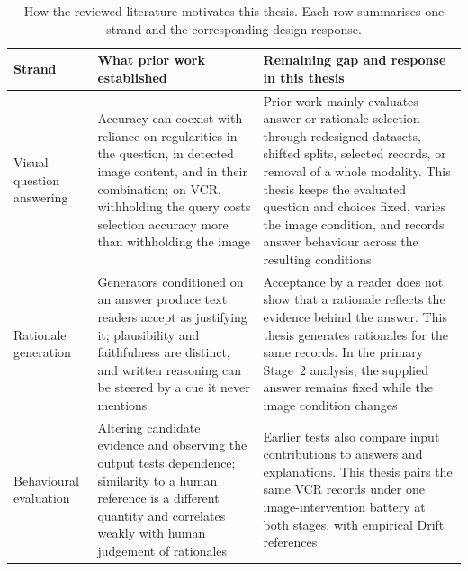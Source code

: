 \begin{table}[ht]
\centering
\caption[How the reviewed literature motivates this thesis]{How the reviewed
literature motivates this thesis. Each row summarises one strand and the
corresponding design response.}
\label{tab:background-positioning}
\begin{tabular}{L{3.0cm}L{4.8cm}L{5.7cm}}
\toprule
Strand & What prior work established & Remaining gap and response in this thesis \\
\midrule
Visual question answering &
Accuracy can coexist with reliance on regularities in the question, in detected
image content, and in their combination; on VCR, withholding the query costs
selection accuracy more than withholding the image &
Prior work mainly evaluates answer or rationale selection through redesigned
datasets, shifted splits, selected records, or removal of a whole modality. This
thesis keeps the evaluated question and choices fixed, varies the image
condition, and records answer behaviour across the resulting conditions \\
\addlinespace
Rationale generation &
Generators conditioned on an answer produce text readers accept as justifying it;
plausibility and faithfulness are distinct, and written reasoning can be steered by
a cue it never mentions &
Acceptance by a reader does not show that a rationale reflects the evidence behind
the answer. This thesis generates rationales for the same records. In the primary
Stage~2 analysis, the supplied answer remains fixed while the image condition
changes \\
\addlinespace
Behavioural evaluation &
Altering candidate evidence and observing the output tests dependence; similarity
to a human reference is a different quantity and correlates weakly with human
judgement of rationales &
Earlier tests also compare input contributions to answers and explanations.
This thesis pairs the same VCR records under one image-intervention battery at
both stages, with empirical Drift references \\
\bottomrule
\end{tabular}
\end{table}

